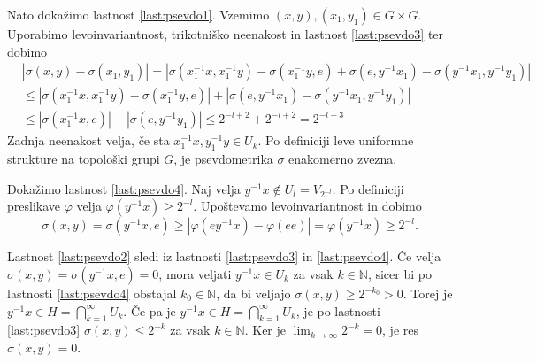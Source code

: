 \documentclass[mat1]{fmfdelo}
\newcommand{\N}{\mathbb N}
\begin{document}
\begin{dokaz}
Nato dokažimo lastnost \ref{last:psevdo1}. Vzemimo $(x, y), (x_1,y_1) \in G \times G$. Uporabimo levoinvariantnost, trikotniško neenakost in lastnost \ref{last:psevdo3} ter dobimo
\begin{align*}
&|\sigma(x, y) - \sigma(x_1, y_1)| = |\sigma(x_1^{-1}x, x_1^{-1}y) - \sigma(x_1^{-1}y, e) + \sigma(e, y^{-1}x_1) - \sigma(y^{-1}x_1, y^{-1}y_1)| \\
&\leq |\sigma(x_1^{-1}x, x_1^{-1}y) - \sigma(x_1^{-1}y, e)| + |\sigma(e, y^{-1}x_1) - \sigma(y^{-1}x_1, y^{-1}y_1)| \\
&\leq |\sigma(x_1^{-1}x, e)| + |\sigma(e, y^{-1}y_1)| \leq 2^{-l+2} + 2^{-l+2} = 2^{-l+3}
\end{align*}
Zadnja neenakost velja, če sta $x_1^{-1}x, y_1^{-1}y \in U_k$. Po definiciji leve uniformne strukture na topološki grupi $G$, je psevdometrika $\sigma$ enakomerno zvezna.

Dokažimo lastnost \ref{last:psevdo4}. Naj velja $y^{-1}x \notin U_l = V_{2^{-l}}$. Po definiciji preslikave $\varphi$ velja $\varphi(y^{-1}x) \geq 2^{-l}$. Upoštevamo levoinvariantnost in dobimo
\[ \sigma(x, y) = \sigma(y^{-1}x, e) \geq |\varphi(ey^{-1}x) - \varphi(ee)| = \varphi(y^{-1}x) \geq 2^{-l}. \]

Lastnost \ref{last:psevdo2} sledi iz lastnosti \ref{last:psevdo3} in \ref{last:psevdo4}. Če velja $\sigma(x, y) = \sigma(y^{-1}x, e) = 0$, mora veljati $y^{-1}x \in U_k$ za vsak $k \in \N$, sicer bi po lastnosti \ref{last:psevdo4} obstajal $k_0 \in \N$, da bi veljajo $\sigma(x, y) \geq 2^{-k_0} > 0$. Torej je $y^{-1}x \in H = \bigcap_{k=1}^\infty U_k$. Če pa je $y^{-1}x \in H = \bigcap_{k=1}^\infty U_k$, je po lastnosti \ref{last:psevdo3} $\sigma(x,y) \leq 2^{-k}$ za vsak $k \in \N$. Ker je $\lim_{k \to \infty}2^{-k} = 0$, je res $\sigma(x, y) = 0$.


\end{dokaz}
\end{document}
